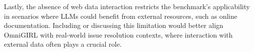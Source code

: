 \documentclass[12pt,american]{article}
\begin{document}
\begin{revresponse}






\end{revresponse}


\begin{revcomment}
Lastly, the absence of web data interaction restricts the benchmark’s applicability in scenarios where LLMs could benefit from external resources, such as online documentation. Including or discussing this limitation would better align OmniGIRL with real-world issue resolution contexts, where interaction with external data often plays a crucial role.
\end{revcomment}
\end{document}
